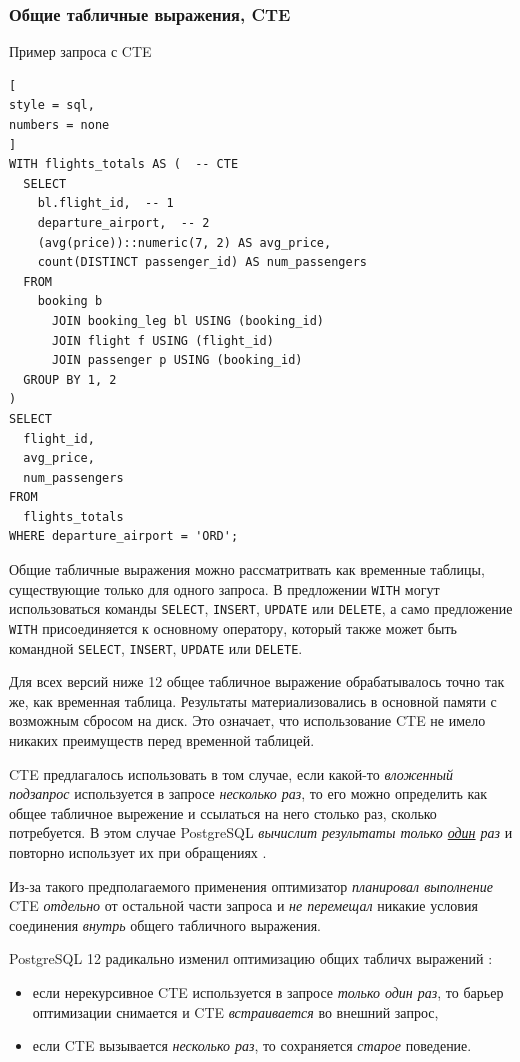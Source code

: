 \documentclass[%
	11pt,
	a4paper,
	utf8,
		]{article}
\begin{document}
\subsubsection{Общие табличные выражения, CTE}

Пример запроса с CTE
\begin{lstlisting}[
style = sql,
numbers = none
]
WITH flights_totals AS (  -- CTE
  SELECT
    bl.flight_id,  -- 1
    departure_airport,  -- 2
    (avg(price))::numeric(7, 2) AS avg_price,
    count(DISTINCT passenger_id) AS num_passengers
  FROM
    booking b
      JOIN booking_leg bl USING (booking_id)
      JOIN flight f USING (flight_id)
      JOIN passenger p USING (booking_id)
  GROUP BY 1, 2
)
SELECT
  flight_id,
  avg_price,
  num_passengers
FROM
  flights_totals
WHERE departure_airport = 'ORD';
\end{lstlisting}

Общие табличные выражения можно рассматритвать как временные таблицы, существующие только для одного запроса. В предложении \verb|WITH| могут использоваться команды \verb|SELECT|, \verb|INSERT|, \verb|UPDATE| или \verb|DELETE|, а само предложение \verb|WITH| присоединяется к основному оператору, который также может быть командной \verb|SELECT|, \verb|INSERT|, \verb|UPDATE| или \verb|DELETE|.

Для всех версий ниже 12 общее табличное выражение обрабатывалось точно так же, как временная таблица. Результаты материализовались в основной памяти с возможным сбросом на диск. Это означает, что использование CTE не имело никаких преимуществ перед временной таблицей.

CTE предлагалось использовать в том случае, если какой-то \emph{вложенный подзапрос} используется в запросе \emph{несколько раз}, то его можно определить как общее табличное вырежение и ссылаться на него столько раз, сколько потребуется. В этом случае PostgreSQL \emph{вычислит результаты только \underline{один} раз} и повторно использует их при обращениях \cite[]{dombrovskaya:postgresql-2022}.

Из-за такого предполагаемого применения оптимизатор \emph{планировал выполнение} CTE \emph{отдельно} от остальной части запроса и {\color{red}\emph{не перемещал} никакие условия соединения \emph{внутрь} общего табличного выражения}. 

PostgreSQL 12 радикально изменил оптимизацию общих табличх выражений \cite[]{dombrovskaya:postgresql-2022}:
\begin{itemize}
	\item если нерекурсивное CTE используется в запросе \emph{только один раз}, то барьер оптимизации снимается и CTE \emph{встраивается} во внешний запрос,
	
	\item если CTE вызывается \emph{несколько раз}, то сохраняется \emph{старое} поведение.
\end{itemize}
\end{document}
